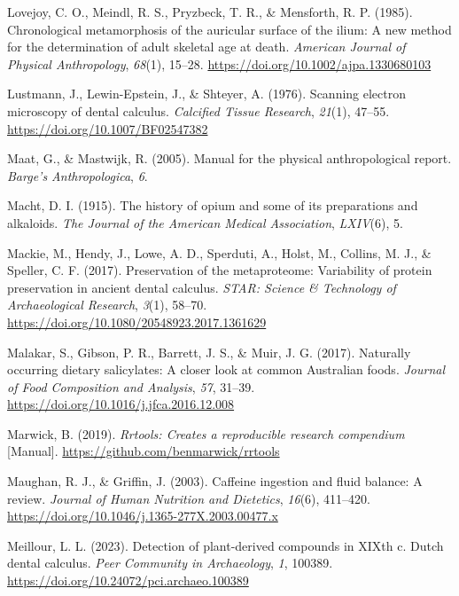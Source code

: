 \documentclass[
]{article}
\newlength{\cslhangindent}
\newenvironment{CSLReferences}[2] %
 {\begin{list}{}{%
  \setlength{\itemindent}{0pt}
  \setlength{\leftmargin}{0pt}
  \setlength{\parsep}{0pt}
  \ifodd #1
   \setlength{\leftmargin}{\cslhangindent}
   \setlength{\itemindent}{-1\cslhangindent}
  \fi
  \setlength{\itemsep}{#2\baselineskip}}}
 {\end{list}}
\begin{document}
\begin{CSLReferences}{1}{0}
Lovejoy, C. O., Meindl, R. S., Pryzbeck, T. R., \& Mensforth, R. P.
(1985). Chronological metamorphosis of the auricular surface of the
ilium: {A} new method for the determination of adult skeletal age at
death. \emph{American Journal of Physical Anthropology}, \emph{68}(1),
15--28. \url{https://doi.org/10.1002/ajpa.1330680103}

Lustmann, J., Lewin-Epstein, J., \& Shteyer, A. (1976). Scanning
electron microscopy of dental calculus. \emph{Calcified Tissue
Research}, \emph{21}(1), 47--55.
\url{https://doi.org/10.1007/BF02547382}

Maat, G., \& Mastwijk, R. (2005). Manual for the physical
anthropological report. \emph{Barge's Anthropologica}, \emph{6}.

Macht, D. I. (1915). The history of opium and some of its preparations
and alkaloids. \emph{The Journal of the American Medical Association},
\emph{LXIV}(6), 5.

Mackie, M., Hendy, J., Lowe, A. D., Sperduti, A., Holst, M., Collins, M.
J., \& Speller, C. F. (2017). Preservation of the metaproteome:
Variability of protein preservation in ancient dental calculus.
\emph{STAR: Science \& Technology of Archaeological Research},
\emph{3}(1), 58--70. \url{https://doi.org/10.1080/20548923.2017.1361629}

Malakar, S., Gibson, P. R., Barrett, J. S., \& Muir, J. G. (2017).
Naturally occurring dietary salicylates: {A} closer look at common
{Australian} foods. \emph{Journal of Food Composition and Analysis},
\emph{57}, 31--39. \url{https://doi.org/10.1016/j.jfca.2016.12.008}

Marwick, B. (2019). \emph{Rrtools: {Creates} a reproducible research
compendium} {[}Manual{]}. \url{https://github.com/benmarwick/rrtools}

Maughan, R. J., \& Griffin, J. (2003). Caffeine ingestion and fluid
balance: A review. \emph{Journal of Human Nutrition and Dietetics},
\emph{16}(6), 411--420.
\url{https://doi.org/10.1046/j.1365-277X.2003.00477.x}

Meillour, L. L. (2023). Detection of plant-derived compounds in {XIXth}
c. {Dutch} dental calculus. \emph{Peer Community in Archaeology},
\emph{1}, 100389. \url{https://doi.org/10.24072/pci.archaeo.100389}


\end{CSLReferences}
\end{document}
